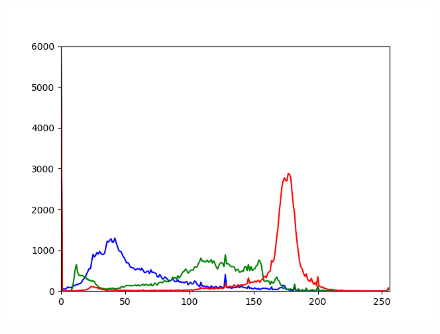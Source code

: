 \documentclass[a4paper,12pt,oneside]{article}
\begin{document}
\begin{figure}[htb]
\begin{minipage}[c]{0.08\textwidth}
\end{minipage}
\hfill
\begin{minipage}[c]{0.3\textwidth}
\includegraphics[width=\textwidth]{Sources/Bild1_GW_histo.png}
\end{minipage}
\end{figure}
\end{document}
